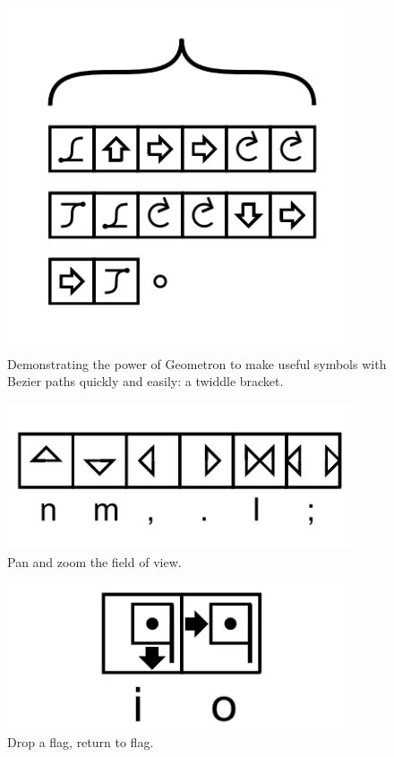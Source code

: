 \begin{figure}
	\centering
	\includegraphics[width=4in]{figures/web2d/bezierbracket.png}
	\caption[bezierbracket]
	{Demonstrating the power of Geometron to make useful symbols with Bezier paths quickly and easily: a twiddle bracket.}
\end{figure}


\begin{figure}
	\centering
	\includegraphics[width=4in]{figures/web2d/panzoom.png}
	\caption[panzoom]
	{Pan and zoom the field of view.}
\end{figure}

\begin{figure}
	\centering
	\includegraphics[width=4in]{figures/web2d/flagactions.png}
	\caption[flagactions]
	{Drop a flag, return to flag.}
\end{figure}


